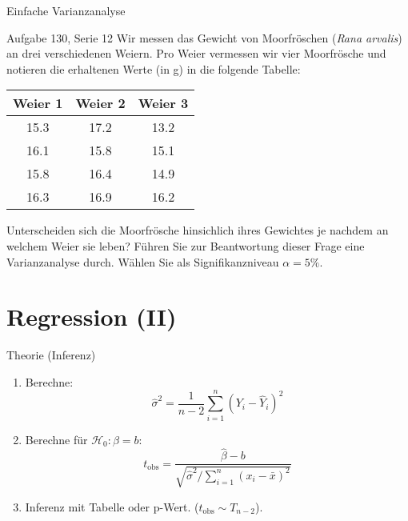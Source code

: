 \documentclass[handout]{beamer}
\begin{document}
\begin{frame}{Einfache Varianzanalyse}
\begin{beamerboxesrounded}[shadow]{Aufgabe 130, Serie 12}
Wir messen das Gewicht von Moorfröschen (\textit{Rana arvalis}) an drei verschiedenen
Weiern. Pro Weier vermessen wir vier Moorfrösche und notieren die erhaltenen
Werte (in g) in die folgende Tabelle:

\vspace{2mm}\begin{center}{\scriptsize\begin{tabular}{ccc}\toprule
Weier 1 & Weier 2 & Weier 3\\\midrule
15.3& 17.2& 13.2\\
16.1& 15.8& 15.1\\
15.8& 16.4& 14.9\\
16.3& 16.9& 16.2\\
\bottomrule
\end{tabular}}\end{center}\vspace{2mm}

Unterscheiden sich die Moorfrösche hinsichlich ihres Gewichtes je nachdem an
welchem Weier sie leben? Führen Sie zur Beantwortung dieser Frage eine Varianzanalyse
durch. Wählen Sie als Signifikanzniveau $\alpha = 5\%$.
\end{beamerboxesrounded}
\end{frame}

\section{Regression (II)}

\begin{frame}{Theorie (Inferenz)}
\begin{enumerate}
\item Berechne:
$$
\hat{\sigma}^2 = \frac{1}{n-2}\sum_{i=1}^n (Y_i-\hat{Y}_i)^2
$$
\item Berechne für $\mathcal{H}_0: \beta=b$:
$$
t_\text{obs}=\frac{\hat\beta-b}{\sqrt{\hat\sigma^2/\sum_{i=1}^n(x_i-\bar{x})^2}}
$$
\item Inferenz mit Tabelle oder p-Wert. ($t_\text{obs}\sim T_{n-2}$).
\end{enumerate}
\end{frame}
\end{document}
